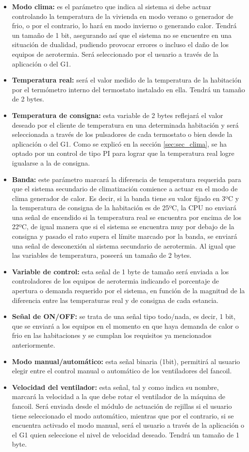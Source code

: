 \begin{itemize}
\item \textbf{Modo clima:} es el parámetro que indica al sistema si debe actuar controlando la temperatura de la vivienda en modo verano o generador de frio, o por el contrario, lo hará en modo invierno o generando calor. Tendrá un tamaño de 1 bit, asegurando así que el sistema no se encuentre en una situación de dualidad, pudiendo provocar errores o incluso el daño de los equipos de aerotermia. Será seleccionado por el usuario a través de la aplicación o del G1.
\item \textbf{Temperatura real:} será el valor medido de la temperatura de la habitación por el termómetro interno del termostato instalado en ella. Tendrá un tamaño de 2 bytes.
\item \textbf{Temperatura de consigna:} esta variable de 2 bytes reflejará el valor deseado por el cliente de temperatura en una determinada habitación y será seleccionada a través de los pulsadores de cada termostato o bien desde la aplicación o del G1. Como se explicó en la sección \ref{sec:sec_clima}, se ha optado por un control de tipo PI para lograr que la temperatura real logre igualarse a la de consigna.
\item \textbf{Banda:} este parámetro marcará la diferencia de temperatura requerida para que el sistema secundario de climatización comience a actuar en el modo de clima generador de calor. Es decir, si la banda tiene su valor fijado en 3ºC y la temperatura de consigna de la habitación es de 25ºC, la CPU no enviará una señal de encendido si la temperatura real se encuentra por encima de los 22ºC, de igual manera que si el sistema se encuentra muy por debajo de la consigna y pasado el rato supera el límite marcado por la banda, se enviará una señal de desconexión al sistema secundario de aerotermia. Al igual que las variables de temperatura, poseerá un tamaño de 2 bytes.
\item \textbf{Variable de control:} esta señal de 1 byte de tamaño será enviada a los controladores de los equipos de aerotermia indicando el porcentaje de apertura o demanda requerido por el sistema, en función de la magnitud de la diferencia entre las temperaturas real y de consigna de cada estancia.
\item \textbf{Señal de ON/OFF:} se trata de una señal tipo todo/nada, es decir, 1 bit,  que se enviará a los equipos en el momento en que haya demanda de calor o frio en las habitaciones y se cumplan los requisitos ya mencionados anteriormente.
\item \textbf{Modo manual/automático:} esta señal binaria (1bit), permitirá al usuario elegir entre el control manual o automático de los ventiladores del fancoil.
\item \textbf{Velocidad del ventilador:} esta señal, tal y como indica su nombre, marcará la velocidad a la que debe rotar el ventilador de la máquina de fancoil. Será enviada desde el módulo de actuación de rejillas si el usuario tiene seleccionado el modo automático, mientras que por el contrario, si se encuentra activado el modo manual, será el usuario a través de la aplicación o el G1 quien seleccione el nivel de velocidad deseado. Tendrá un tamaño de 1 byte.
\end{itemize}


